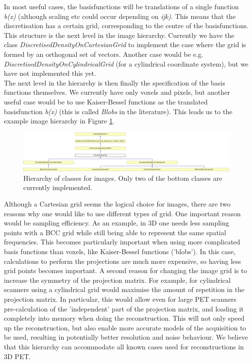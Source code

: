 \documentclass{article}
\begin{document}
In most useful cases, the basisfunctions will be translations 
of a single function \textit{b(x)} (although scaling etc could occur 
depending on \textit{ijk)}. This means that the discretisation has 
a certain grid, corresponding to the centre of the basisfunctions. 
This structure is the next level in the image hierarchy. Currently 
we have the class \textit{DiscretisedDensityOnCartesianGrid} to implement 
the case where the grid is formed by an orthogonal set of vectors. 
Another case would be e.g. \textit{DiscretisedDensityOnCylindricalGrid} 
(for a cylindrical coordinate system), but we have not implemented 
this yet.\\
The next level in the hierarchy is then finally the specification 
of the basis functions themselves. We currently have only voxels 
and pixels, but another useful case would be to use Kaiser-Bessel 
functions as the translated basisfunction \textit{b(x)} (this is called \textit{Blobs} 
in the literature). This leads us to the example image hierarchy 
in Figure \ref{image-hierarchy}.\\
\begin{figure}[htbp]
\begin{center}
\includegraphics[bb = 0 0 1613 303, scale=0.25]{graphics/STIR-developers-overviewFig7}
\caption{ Hierarchy of classes for images. Only two 
of the bottom classes are currently implemented.}
\label{image-hierarchy}
\end{center}
\end{figure}


Although a Cartesian grid seems the logical choice for images, 
there are two reasons why one would like to use different types 
of grid. One important reason would be sampling efficiency. As 
an example, in 3D one needs less sampling points with a BCC grid 
while still being able to represent the same spatial frequencies. 
This becomes particularly important when using more complicated 
basis functions than voxels, like Kaiser-Bessel functions ('blobs'). 
In this case, calculations to perform the projections are much 
more expensive, so having less grid points becomes important. 
A second reason for changing the image grid is to increase the 
symmetry of the projection matrix. For example, for cylindrical 
scanners using a cylindrical grid would maximise the amount of 
repetition in the projection matrix. In particular, this would 
allow even for large PET scanners pre-calculation of the 'independent' 
part of the projection matrix, and loading it completely into 
memory when doing the reconstruction. This will not only speed 
up the reconstruction, but also enable more accurate models of 
the acquisition to be used, resulting in potentially better resolution 
and noise behaviour. We believe that this hierarchy can accommodate 
all known cases used for reconstructions in 3D PET.
\end{document}
